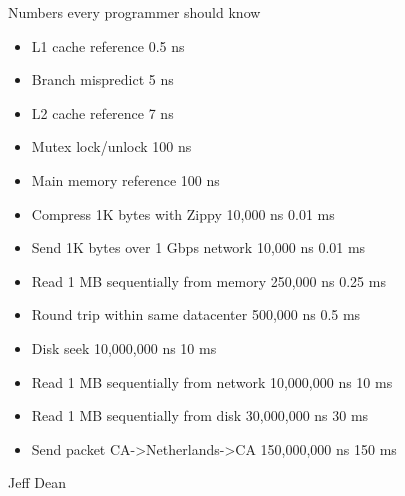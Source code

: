 \documentclass{beamer}
\begin{document}
\begin{frame}{Numbers every programmer should know}
  \begin{itemize}
    \item L1 cache reference 0.5 ns
    \item Branch mispredict 5 ns
    \item L2 cache reference 7 ns
    \item Mutex lock/unlock 100 ns
    \item Main memory reference 100 ns
    \item Compress 1K bytes with Zippy 10,000 ns 0.01 ms
    \item Send 1K bytes over 1 Gbps network 10,000 ns 0.01 ms
    \item Read 1 MB sequentially from memory 250,000 ns 0.25 ms
    \item Round trip within same datacenter 500,000 ns 0.5 ms
    \item Disk seek 10,000,000 ns 10 ms
    \item Read 1 MB sequentially from network 10,000,000 ns 10 ms
    \item Read 1 MB sequentially from disk 30,000,000 ns 30 ms
    \item Send packet CA->Netherlands->CA 150,000,000 ns 150 ms
  \end{itemize}
  Jeff Dean
\end{frame}
\end{document}
